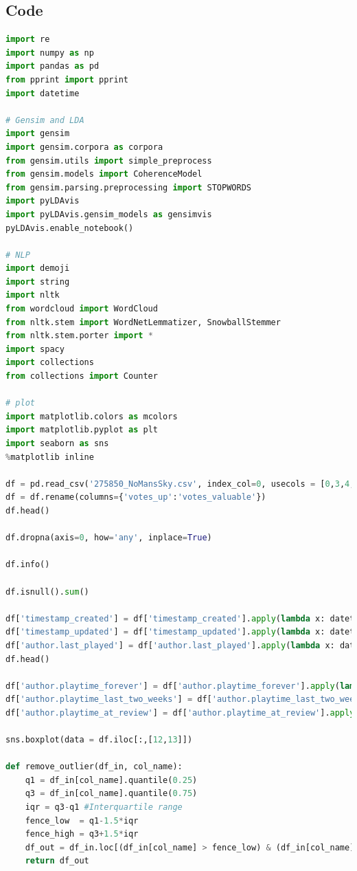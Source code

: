 \documentclass[12pt]{article}
\begin{document}
\subsection{Code}
\scriptsize
\begin{lstlisting}[language = Python]
import re
import numpy as np
import pandas as pd
from pprint import pprint
import datetime

# Gensim and LDA
import gensim
import gensim.corpora as corpora
from gensim.utils import simple_preprocess
from gensim.models import CoherenceModel
from gensim.parsing.preprocessing import STOPWORDS
import pyLDAvis
import pyLDAvis.gensim_models as gensimvis
pyLDAvis.enable_notebook()

# NLP
import demoji
import string
import nltk
from wordcloud import WordCloud 
from nltk.stem import WordNetLemmatizer, SnowballStemmer
from nltk.stem.porter import *
import spacy
import collections
from collections import Counter

# plot
import matplotlib.colors as mcolors
import matplotlib.pyplot as plt
import seaborn as sns
%matplotlib inline

df = pd.read_csv('275850_NoMansSky.csv', index_col=0, usecols = [0,3,4,5,6,7,8,9,10,12,13,15,16,17,18,19,20])
df = df.rename(columns={'votes_up':'votes_valuable'})
df.head()

df.dropna(axis=0, how='any', inplace=True)

df.info()

df.isnull().sum()

df['timestamp_created'] = df['timestamp_created'].apply(lambda x: datetime.datetime.fromtimestamp(x))
df['timestamp_updated'] = df['timestamp_updated'].apply(lambda x: datetime.datetime.fromtimestamp(x))
df['author.last_played'] = df['author.last_played'].apply(lambda x: datetime.datetime.fromtimestamp(x))
df.head()

df['author.playtime_forever'] = df['author.playtime_forever'].apply(lambda x: x/60)
df['author.playtime_last_two_weeks'] = df['author.playtime_last_two_weeks'].apply(lambda x: x/60)
df['author.playtime_at_review'] = df['author.playtime_at_review'].apply(lambda x: x/60)

sns.boxplot(data = df.iloc[:,[12,13]])

def remove_outlier(df_in, col_name):
    q1 = df_in[col_name].quantile(0.25)
    q3 = df_in[col_name].quantile(0.75)
    iqr = q3-q1 #Interquartile range
    fence_low  = q1-1.5*iqr
    fence_high = q3+1.5*iqr
    df_out = df_in.loc[(df_in[col_name] > fence_low) & (df_in[col_name] < fence_high)]
    return df_out
    

\end{lstlisting}
\end{document}
